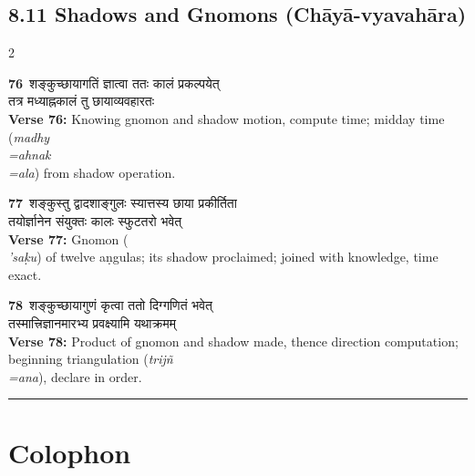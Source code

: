 \documentclass[11pt,a4paper]{article}
\newcommand{\dev}[1]{{\devanagarifont #1}}
\newcommand{\iast}[1]{\textit{#1}}
\newcommand{\vnum}[1]{\textcolor{versenumbercolor}{\textbf{#1}}}
\begin{document}
\subsection*{8.11 Shadows and Gnomons (Ch\=ay\=a-vyavah\=ara)}
\label{sec:8.11}

\begin{paracol}{2}

\switchcolumn[0]
\vnum{76}\ \dev{शङ्कुच्छायागतिं ज्ञात्वा ततः कालं प्रकल्पयेत्}\\
\dev{तत्र मध्याह्नकालं तु छायाव्यवहारतः}\\
\switchcolumn[1]
\textbf{Verse 76:} Knowing gnomon and shadow motion, compute time; midday time (\iast{madhy\\=ahnak\\=ala}) from shadow operation.

\switchcolumn[0]
\vnum{77}\ \dev{शङ्कुस्तु द्वादशाङ्गुलः स्यात्तस्य छाया प्रकीर्तिता}\\
\dev{तयोर्ज्ञानेन संयुक्तः कालः स्फुटतरो भवेत्}\\
\switchcolumn[1]
\textbf{Verse 77:} Gnomon (\iast{\\'sa\d ku}) of twelve a\d ngulas; its shadow proclaimed; joined with knowledge, time exact.

\switchcolumn[0]
\vnum{78}\ \dev{शङ्कुच्छायागुणं कृत्वा ततो दिग्गणितं भवेत्}\\
\dev{तस्मात्त्रिज्ञानमारभ्य प्रवक्ष्यामि यथाक्रमम्}\\
\switchcolumn[1]
\textbf{Verse 78:} Product of gnomon and shadow made, thence direction computation; beginning triangulation (\iast{trijñ\\=ana}), declare in order.

\end{paracol}

\vspace{0.5em}
\noindent\rule{\textwidth}{0.6pt}
\vspace{0.5em}

\section*{Colophon}
\end{document}
